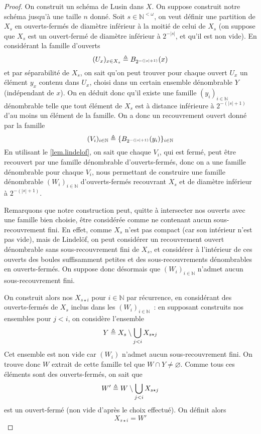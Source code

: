 \begin{proof}
  On construit un schéma de Lusin dans $X$. On suppose construit notre schéma
  jusqu'à une taille $n$ donné. Soit $s \in \mathbb N^{<\omega}$, on veut
  définir une partition de $X_s$ en ouverts-fermés de diamètre inférieur à
  la moitié de celui de $X_s$ (on suppose que $X_s$ est un ouvert-fermé de
  diamètre inférieur à $2^{-|s|}$, et qu'il est non vide). En considérant la
  famille d'ouverts
  \[(U_x)_{x \in X_s} \triangleq B_{2^{-(|s| + 1)}}(x)\]
  et par séparabilité de $X_s$, on sait qu'on peut trouver pour chaque ouvert
  $U_x$ un élément $y_x$ contenu dans $U_x$, choisi dans un certain ensemble
  dénombrable $Y$ (indépendant de $x$). On en déduit donc qu'il existe une
  famille $(y_i)_{i\in \mathbb N}$ dénombrable telle que tout élément de $X_s$ est
  à distance inférieure à $2^{-(|s| + 1)}$ d'au moins un élément de la famille.
  On a donc un recouvrement ouvert donné par la famille
  \[(V_i)_{i \in \mathbb N} \triangleq\{B_{2^{-(|s| + 1)}}(y_i)\}_{i \in \mathbb N}\]
  En utilisant le \cref{lem.lindelof}, on sait que chaque $V_i$, qui est fermé,
  peut être recouvert par une famille dénombrable d'ouverts-fermés, donc on a
  une famille dénombrable pour chaque $V_i$, nous permettant de construire une
  famille dénombrable $(W_i)_{i \in\mathbb N}$ d'ouverts-fermés recouvrant $X_s$
  et de diamètre inférieur à $2^{-(|s| + 1)}$.

  Remarquons que notre construction peut, quitte à intersecter nos ouverts
  avec une famille bien choisie, être considérée comme ne contenant aucun
  sous-recouvrement fini. En effet, comme $X_s$ n'est pas compact (car son
  intérieur n'est pas vide), mais de Lindelöf, on peut considérer un
  recouvrement ouvert dénombrable sans sous-recouvrement fini de $X_s$, et
  considérer à l'intérieur de ces ouverts des boules suffisamment petites et des
  sous-recouvrements dénombrables en ouverts-fermés. On suppose donc désormais
  que $(W_i)_{i \in \mathbb N}$ n'admet aucun sous-recouvrement fini.

  On construit alors nos $X_{s\star i}$ pour $i \in \mathbb N$ par récurrence, en
  considérant des ouverts-fermés de $X_s$ inclus dans les
  $(W_i)_{i\in \mathbb N}$~: en supposant construits nos ensembles pour $j < i$,
  on considère l'ensemble
  \[Y \triangleq X_s\setminus\bigcup_{j < i} X_{s\star j}\]
  Cet ensemble est non vide car $(W_i)$ n'admet aucun sous-recouvrement fini. On
  trouve donc $W$ extrait de cette famille tel que $W\cap Y \neq \varnothing$.
  Comme tous ces éléments sont des ouverts-fermés, on sait que
  \[W' \triangleq W \setminus \bigcup_{j < i} X_{s\star j}\]
  est un ouvert-fermé (non vide d'après le choix effectué). On définit alors
  \[X_{s \star i} = W'\]


\end{proof}
